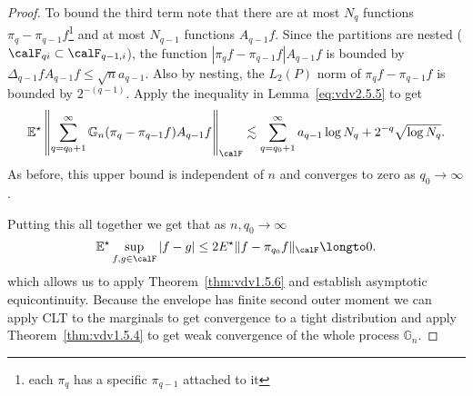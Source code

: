 \begin{proof}
	To bound the third term note that there are at most \(N_q\) functions \(\pi_q-\pi_{q-1}f\)\footnote{each \(\pi_q\) has a specific \(\pi_{q-1}\) attached to it} and at most \(N_{q-1}\) functions \(A_{q-1}f\). Since the partitions are nested (\(\calF_{qi}\subset\calF_{q-1,i}\)), the function \(|\pi_qf-\pi_{q-1}f|A_{q-1}f\) is bounded by \(\Delta_{q-1}fA_{q-1}f\leq \sqrt{n}a_{q-1}\). Also by nesting, the \(L_2(P)\) norm of \(\pi_qf-\pi_{q-1}f\) is bounded by \(2^{-(q-1)}\). Apply the inequality in Lemma~\ref{eq:vdv2.5.5} to get
	\[
		\E^\star\left\|\sum_{q=q_0+1}^\infty \mathbb{G}_n(\pi_q-\pi_{q-1}f)A_{q-1}f\right\|_\calF \lesssim \sum_{q=q_0+1}^\infty a_{q-1}\log N_q + 2^{-q}\sqrt{\log N_q} 
	.\] 
	As before, this upper bound is independent of \(n\) and converges to zero as \(q_0\to\infty\).

	Putting this all together we get that as \(n,q_0\to\infty\) 
	\[
		\E^\star\sup_{f,g\in\calF}|f-g| \leq 2E^\star \|f-\pi_{q_0}f\|_\calF\longto 0
	.\]
	which allows us to apply Theorem~\ref{thm:vdv1.5.6} and establish asymptotic equicontinuity. Because the envelope has finite second outer moment we can apply CLT to the marginals to get convergence to a tight distribution and apply Theorem~\ref{thm:vdv1.5.4} to get weak convergence of the whole process \(\mathbb{G}_n\).
\end{proof}

